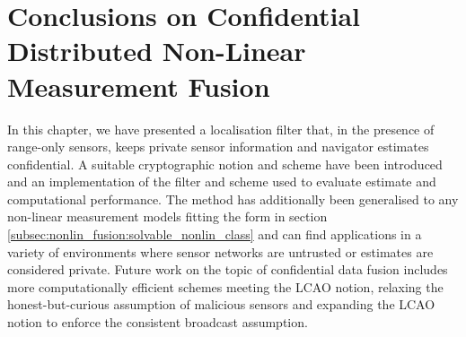 \section{Conclusions on Confidential Distributed Non-Linear Measurement Fusion}\label{sec:nonlin_fusion:conclusion}
In this chapter, we have presented a localisation filter that, in the presence of range-only sensors, keeps private sensor information and navigator estimates confidential. A suitable cryptographic notion and scheme have been introduced and an implementation of the filter and scheme used to evaluate estimate and computational performance. The method has additionally been generalised to any non-linear measurement models fitting the form in section \ref{subsec:nonlin_fusion:solvable_nonlin_class} and can find applications in a variety of environments where sensor networks are untrusted or estimates are considered private. Future work on the topic of confidential data fusion includes more computationally efficient schemes meeting the LCAO notion, relaxing the honest-but-curious assumption of malicious sensors and expanding the LCAO notion to enforce the consistent broadcast assumption.